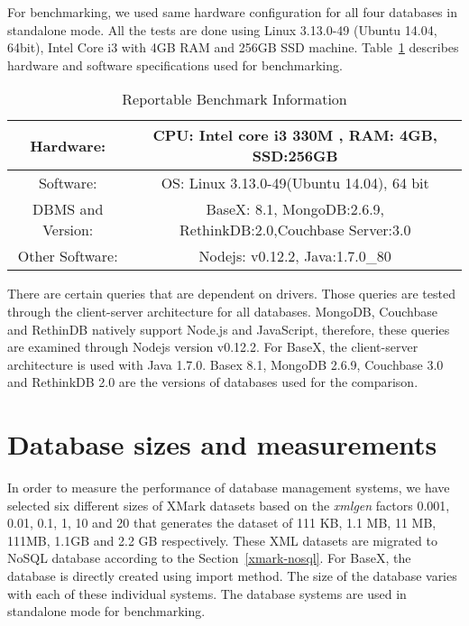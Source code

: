 For benchmarking, we used same hardware configuration for all four databases in standalone mode. All the tests are done using  Linux 3.13.0-49 (Ubuntu 14.04, 64bit), Intel Core i3 with 4GB RAM and 256GB SSD machine.
Table~\ref{benchmark-configuration-table} describes hardware and software specifications used for benchmarking. 
\begin{table}[h]	
	\centering
	\caption{Reportable Benchmark Information}
	\begin{tabular}{|c|c|c|c} 
		\hline
		Hardware: & \multicolumn{3}{p{8cm}|}{CPU: Intel core i3 330M , RAM: 4GB, SSD:256GB  } \\
		\hline
		Software: & \multicolumn{3}{p{8cm}|}{OS: Linux 3.13.0-49(Ubuntu 14.04), 64 bit} \\
		\hline
		DBMS and Version: & \multicolumn{3}{p{8cm}|}{ BaseX: 8.1, MongoDB:2.6.9, RethinkDB:2.0,Couchbase Server:3.0 } \\
		\hline
		Other Software: & \multicolumn{3}{|c|}{Nodejs: v0.12.2, Java:1.7.0\_80 } \\
		\hline
	\end{tabular}	
	\label{benchmark-configuration-table}
\end{table}
There are certain queries that are dependent on drivers. Those queries are tested through the client-server architecture for all databases. MongoDB, Couchbase and RethinDB natively support Node.js and JavaScript, therefore, these queries are examined through Nodejs version  v0.12.2. For BaseX, the client-server architecture is used with Java 1.7.0. Basex 8.1, MongoDB 2.6.9, Couchbase 3.0 and RethinkDB 2.0 are the versions of databases used for the comparison. 
\par
\section{Database sizes and measurements}\label{benchmark-database-size}
In order to measure the performance of database management systems, we have selected six different sizes of XMark datasets based on the \textit{xmlgen} factors 0.001, 0.01, 0.1, 1, 10 and 20 that generates the dataset of 111 KB, 1.1 MB, 11 MB, 111MB, 1.1GB and 2.2 GB respectively. These XML datasets are migrated to NoSQL database according to the Section~\ref{xmark-nosql}. For BaseX, the database is directly created using import method. The size of the database varies with each of these individual systems. The database systems are used in standalone mode for benchmarking.